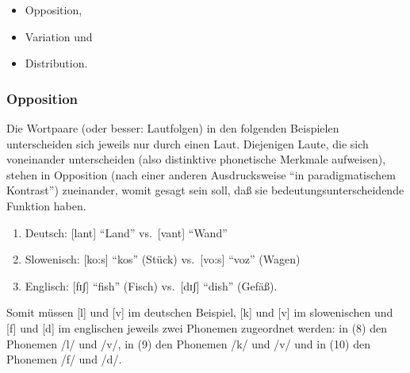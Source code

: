 \documentclass[
]{article}
\begin{document}
\begin{itemize}
\item
  Opposition,
\item
  Variation und
\item
  Distribution.
\end{itemize}

\hypertarget{opposition}{%
\subsubsection{Opposition}\label{opposition}}

Die Wortpaare (oder besser: Lautfolgen) in den folgenden Beispielen
unterscheiden sich jeweils nur durch einen Laut. Diejenigen Laute, die
sich voneinander unterscheiden (also distinktive phonetische Merkmale
aufweisen), stehen in Opposition (nach einer anderen Ausdrucksweise ``in
paradigmatischem Kontrast'') zueinander, womit gesagt sein soll, daß sie
bedeutungsunterscheidende Funktion haben.

\begin{enumerate}
\def\labelenumi{(\arabic{enumi})}
\setcounter{enumi}{7}
\item
  Deutsch: {[}lant{]} ``Land'' vs.~{[}vant{]} ``Wand''
\item
  Slowenisch: {[}ko:s{]} ``kos'' (Stück) vs.~{[}vo:s{]} ``voz'' (Wagen)
\item
  Englisch: {[}fɪʃ{]} ``fish'' (Fisch) vs.~{[}dɪʃ{]} ``dish'' (Gefäß).
\end{enumerate}

Somit müssen {[}l{]} und {[}v{]} im deutschen Beispiel, {[}k{]} und {[}v{]} im
slowenischen und {[}f{]} und {[}d{]} im englischen jeweils zwei Phonemen
zugeordnet werden: in (8) den Phonemen /l/ und /v/, in (9) den Phonemen
/k/ und /v/ und in (10) den Phonemen /f/ und /d/.
\end{document}
